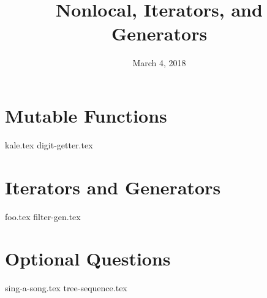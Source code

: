 \documentclass{exam}
\title{Nonlocal, Iterators, and Generators}
\date{March 4, 2018}
\begin{document}
\maketitle

\section{Mutable Functions}
\begin{questions}
{kale.tex}
\newpage
{digit-getter.tex}
\end{questions}

\section{Iterators and Generators}
\begin{questions}
{foo.tex}
\newpage
{filter-gen.tex}
\end{questions}

\newpage

\section{Optional Questions}
\begin{questions}
{sing-a-song.tex}
\newpage
{tree-sequence.tex}
\end{questions}
\end{document}
